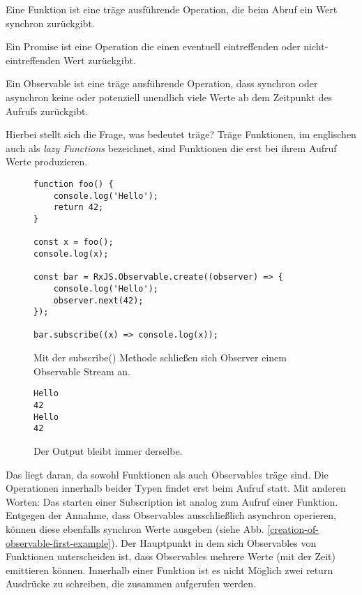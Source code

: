 \begin{description}
\item Eine Funktion ist eine träge ausführende Operation, die beim Abruf ein Wert synchron zurückgibt.
\item Ein Promise ist eine Operation die einen eventuell eintreffenden oder nicht-eintreffenden Wert zurückgibt.
\item Ein Observable ist eine träge ausführende Operation, dass synchron oder asynchron keine oder potenziell unendlich viele Werte ab dem Zeitpunkt des Aufrufs zurückgibt.
\end{description}

\noindent
Hierbei stellt sich die Frage, was bedeutet träge? Träge Funktionen, im englischen auch als \textit{lazy Functions} bezeichnet, sind Funktionen die erst bei ihrem Aufruf Werte produzieren\cite{lazy-functions}.

\begin{figure}[H]
\begin{lstlisting}[basicstyle=\small]
function foo() {
    console.log('Hello');
    return 42;
}

const x = foo();
console.log(x);

const bar = RxJS.Observable.create((observer) => {
    console.log('Hello');
    observer.next(42);
});

bar.subscribe((x) => console.log(x));
\end{lstlisting}
\caption{Mit der subscribe() Methode schließen sich Observer einem Observable Stream an.}
\end{figure}

\begin{figure}[H]
\begin{lstlisting}
Hello
42
Hello
42
\end{lstlisting}
\caption{Der Output bleibt immer derselbe.}
\end{figure}

\noindent
Das liegt daran, da sowohl Funktionen als auch Observables träge sind. Die Operationen innerhalb beider Typen findet erst beim Aufruf statt. Mit anderen Worten: Das starten einer Subscription ist analog zum Aufruf einer Funktion. Entgegen der Annahme, dass Observables ausschließlich asynchron operieren, können diese ebenfalls synchron Werte ausgeben (siehe Abb. \ref{creation-of-observable-first-example}). Der Hauptpunkt in dem sich Observables von Funktionen unterscheiden ist, dass Observables mehrere Werte (mit der Zeit) emittieren können. Innerhalb einer Funktion ist es nicht Möglich zwei return Ausdrücke zu schreiben, die zusammen aufgerufen werden.

